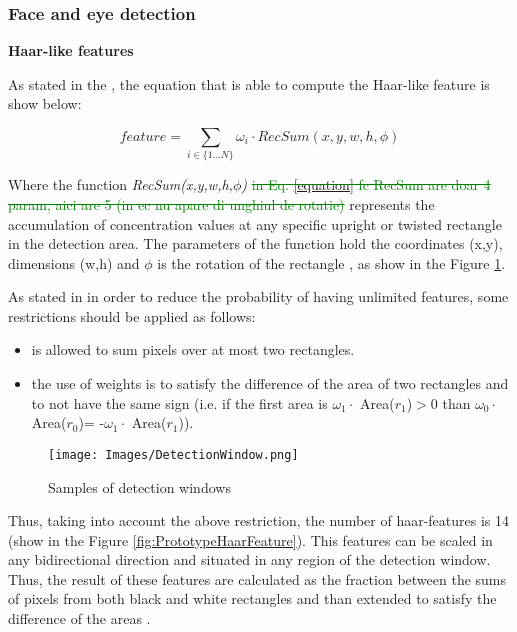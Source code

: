 \subsubsection{Face and eye detection}

\textbf{Haar-like features} \newline

As stated in the \cite{Lienhart}, the equation that is able to compute the Haar-like feature is show below: \cite{Haar}

\begin{center}
    \begin{equation}
        \textit{feature} = \sum_{i \in \{1...N\}} \omega_{i} \cdot RecSum(x,y,w,h,\phi)
    \end{equation}
\end{center}

\noindent
Where the function \textit{RecSum(x,y,w,h,$\phi$)} \textcolor{green}{\sout{in Eq. \ref{equation} fc RecSum are doar 4 param, aici are 5 (in ec nu apare di unghiul de rotatie)}} represents the accumulation of concentration values at any specific upright or twisted rectangle in the detection area. The parameters of the function hold the coordinates (x,y), dimensions (w,h) and $\phi$ is the rotation of the rectangle \cite{Haar}, as show in the Figure \ref{fig:DetectionWindow}.

As stated in \cite{Haar} in order to reduce the probability of having unlimited features, some restrictions should be applied as follows:
\begin{itemize}
    \item is allowed to sum pixels over at most two rectangles.
    \item the use of weights is to satisfy the difference of the area of two rectangles and to not have the same sign (i.e. if the first area is $\omega_{1} \cdot$ Area($r_{1}$)$>$0 than $\omega_{0} \cdot$ Area($r_{0}$)= -$\omega_{1} \cdot$ Area($r_{1}$)).
\end{itemize}

\begin{figure}[h!]
    \centering
    \texttt{[image: Images/DetectionWindow.png]}
    \caption{Samples of detection windows  \cite{Haar}}
    \label{fig:DetectionWindow}
\end{figure}

Thus, taking into account the above restriction, the number of haar-features is 14 (show in the Figure \ref{fig:PrototypeHaarFeature}). This features can be scaled in any bidirectional direction and situated in any region of the detection window. Thus, the result of these features are calculated as the fraction between the sums of pixels from both black and white rectangles and than extended to satisfy the difference of the areas \cite{Haar}.

